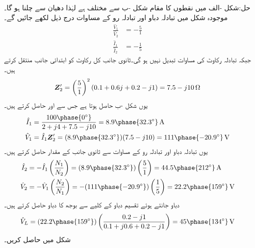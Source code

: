 حل:شکل -الف میں نقطوں کا مقام شکل -ب سے مختلف ہے لہٰذا دھیان سے چلنا ہو گا۔موجودہ شکل میں تبادلہ دباو اور تبادلہ رو کے مساوات درج ذیل لکھے جائیں گے۔
\begin{align*}
\frac{\hat{V}_1}{\hat{V}_2}&=-\frac{5}{1}\\
\frac{\hat{I}_1}{\hat{I}_2}&=-\frac{1}{5}
\end{align*}
جبکہ تبادلہ رکاوٹ کی مساوات تبدیل نہیں ہو گی۔ثانوی جانب کل رکاوٹ کو ابتدائی جانب منتقل کرتے ہیں۔
\begin{align*}
{\ensuremath{{\boldsymbol{Z}}}}_2'=\left(\frac{5}{1}\right)^2 (0.1+0.6j+0.2-j1)=7.5-j10\,\si{\ohm}
\end{align*} 
یوں شکل -ب حاصل ہوتا ہے جس سے  اور  حاصل کرتے ہیں۔
\begin{align*}
\hat{I}_1&=\frac{100\phase{0^{\circ}}}{2+j4+7.5-j10}=8.9\phase{32.3^{\circ}}\,\si{\ampere}\\
\hat{V}_1&=\hat{I}_1 \bZ_2'=(8.9\phase{32.3^{\circ}})(7.5-j10)=111\phase{-20.9^{\circ}}\,\si{\volt}
\end{align*}
یوں تبادلہ دباو اور تبادلہ رو کے مساوات سے ثانوی جانب کے مقدار حاصل کرتے ہیں۔
\begin{align*}
\hat{I}_2&=-\hat{I}_1\left(\frac{N_1}{N_2}\right)=(8.9\phase{32.3^{\circ}})\left(\frac{5}{1}\right)=44.5\phase{212^{\circ}}\,\si{\ampere}\\
\hat{V}_2&=-\hat{V}_1\left(\frac{N_2}{N_1}\right)=-(111\phase{-20.9^{\circ}})\left(\frac{1}{5}\right)=22.2\phase{159^{\circ}}\,\si{\volt}
\end{align*}
دباو  جانتے ہوئے تقسیم دباو کے کلیے سے بوجھ کا دباو حاصل کرتے ہیں۔
\begin{align*}
\hat{V}_L=(22.2\phase{159^{\circ}}) \left(\frac{0.2-j1}{0.1+j0.6+0.2-j1}\right)=45\phase{134^{\circ}}\,\si{\volt}
\end{align*}
شکل  میں  حاصل کریں۔

